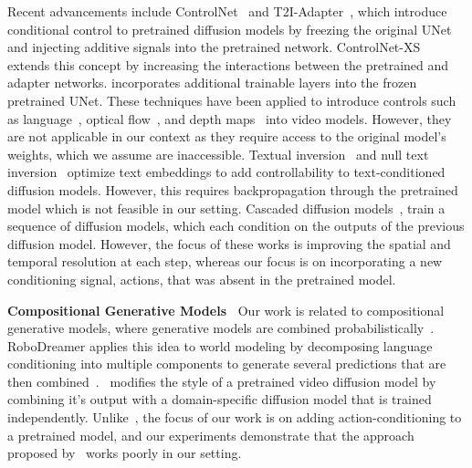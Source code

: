 Recent advancements include ControlNet~\citep{zhang2023adding} and T2I-Adapter~\citep{mou2024t2i}, which introduce conditional control to pretrained diffusion models by freezing the original UNet and injecting additive signals into the pretrained network. ControlNet-XS~\citep{zavadski2023controlnet} extends this concept by increasing the interactions between the pretrained and adapter networks. \citet{li2023gligen} incorporates additional trainable layers into the frozen pretrained UNet. These techniques have been applied to introduce controls such as language~\citep{xing2024aid}, optical flow~\citep{hu2023videocontrolnet}, and depth maps~\citep{chen2023control} into video models. However, they are not applicable in our context as they require access to the original model’s weights, which we assume are inaccessible. Textual inversion~\citep{gal2023image} and null text inversion~\citep{mokady2023null} optimize text embeddings to add controllability to text-conditioned diffusion models. However, this  requires backpropagation through the pretrained model which is not feasible in our setting. Cascaded diffusion models~\citep{ho2022imagen, ho2022cascaded}, train a sequence of diffusion models, which each condition on the outputs of the previous diffusion model. However, the focus of these works is improving the spatial and temporal resolution at each step, whereas our focus is on incorporating a new conditioning signal, actions, that was absent in the pretrained model.



\textbf{Compositional Generative Models\ } Our work is related to compositional generative models, where generative models are combined probabilistically~\citep{liu2022compositional, nie2021controllable, du2020compositional}. RoboDreamer applies this idea to world modeling by decomposing language conditioning into multiple components to generate several predictions that are then combined~\citep{zhou2024robodreamer}.~\cite{yang2024probabilistic} modifies the style of a pretrained video diffusion model by combining it's output with a domain-specific diffusion model that is trained independently. Unlike~\cite{yang2024probabilistic}, the focus of our work is on adding action-conditioning to a pretrained model, and our experiments demonstrate that the approach proposed by~\cite{yang2024probabilistic} works poorly in our setting.